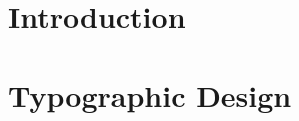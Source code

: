 \documentclass[a4paper,11pt,twoside]{memoir}
\begin{document}
\captionnamefont{\bfseries}

\frontmatter
{}







\cleardoublepage
{}


\setcounter{tocdepth}{1}

\cleardoublepage
\pagestyle{numberCorner}
\tableofcontents*


\mainmatter
{}
\pagestyle{numberCorner}

\chapter{Introduction}
\label{ch:intro}


\chapter{Typographic Design}
\label{ch:typo}


\end{document}
